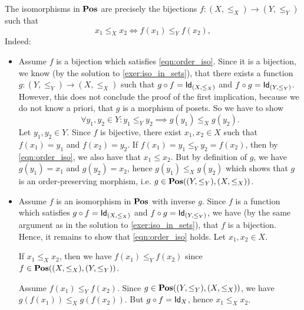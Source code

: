 \begin{solution}\label{sol:iso_in_pos}
The isomorphisms in $\POS$ are precisely the bijections $f:(X,\leq_X) \to (Y,\leq_Y)$ such that 
\begin{equation}\label{eqn:order_iso}
x_1 \leq_X x_2 \iff f(x_1) \leq_Y f(x_2),
\end{equation}
Indeed:
\begin{itemize}
\item Assume $f$ is a bijection which satisfies \cref{eqn:order_iso}. Since it is a bijection, we know (by the solution to \cref{exer:iso_in_sets}), that there exists a function $g:(Y,\leq_Y)\to (X,\leq_X)$ such that $\co{f}{g}=\Id[(X,\leq_X)]$ and $\co{g}{f}=\Id[(Y,\leq_Y)]$. However, this does not conclude the proof of the first implication, because we do not know a priori, that $g$ is a morphism of posets. So we have to show
\[
\forall y_1,y_2\in Y: y_1\leq_Y y_2 \implies g(y_1)\leq_X g(y_2).
\]
Let $y_1,y_2\in Y$. Since $f$ is bijective, there exist $x_1,x_2 \in X$ such that $f(x_1)=y_1$ and $f(x_2)=y_2$. If $f(x_1) = y_1\leq_Y y_2 = f(x_2)$, then by \cref{eqn:order_iso}, we also have that $x_1 \leq x_2$. But by definition of $g$, we have $g(y_1)=x_1$ and $g(y_2)=x_2$, hence $g(y_1)\leq_X g(y_2)$ which shows that $g$ is an order-preserving morphism, i.e. $g \in \CHom{\POS}{(Y,\leq_Y)}{(X,\leq_X)}$.
\item Assume $f$ is an isomorphism in $\POS$ with inverse $g$. Since $f$ is a function which satisfies $\co{f}{g}=\Id[(X,\leq_X)]$ and $\co{g}{f}=\Id[(Y,\leq_Y)]$, we have (by the same argument as in the solution to \cref{exer:iso_in_sets}), that $f$ is a bijection. Hence, it remains to show that \cref{eqn:order_iso} holds. Let $x_1,x_2\in X$.
  
  If $x_1\leq_X x_2$, then we have $f(x_1)\leq_Y f(x_2)$ since $f \in\CHom{\POS}{(X,\leq_X)}{(Y,\leq_Y)}$.
  
Assume $f(x_1)\leq_Y f(x_2)$. Since $g \in\CHom{\POS}{(Y,\leq_Y)}{(X,\leq_X)}$, we have $g(f(x_1)) \leq_X g(f(x_2))$. But $\co{f}{g} = \Id[X]$, hence $x_1 \leq_X x_2$.
\end{itemize}
\end{solution}

